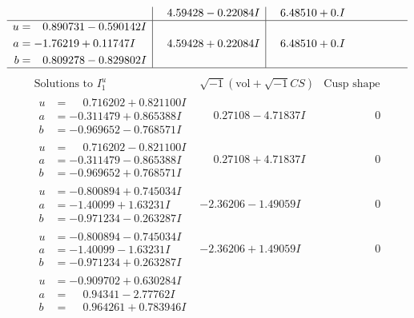 \documentclass[1p]{elsarticle_modified}
\theoremstyle{definition}
\newcommand{\I}{\sqrt{-1}}
\begin{document}
$$\begin{array}{c|c|c}
 & \phantom{-}4.59428 - 0.22084 I & \phantom{-}6.48510 + 0. I\phantom{ +0.000000I} \\ \hline\begin{aligned}
u &= \phantom{-}0.890731 - 0.590142 I \\
a &= -1.76219 + 0.11747 I \\
b &= \phantom{-}0.809278 - 0.829802 I\end{aligned}
 & \phantom{-}4.59428 + 0.22084 I & \phantom{-}6.48510 + 0. I\phantom{ +0.000000I}\\
 \hline 
 \end{array}$$\newpage$$\begin{array}{c|c|c}  
\text{Solutions to }I^u_{1}& \I (\text{vol} + \sqrt{-1}CS) & \text{Cusp shape}\\
 \hline 
\begin{aligned}
u &= \phantom{-}0.716202 + 0.821100 I \\
a &= -0.311479 + 0.865388 I \\
b &= -0.969652 - 0.768571 I\end{aligned}
 & \phantom{-}0.27108 - 4.71837 I & \phantom{-0.000000 } 0 \\ \hline\begin{aligned}
u &= \phantom{-}0.716202 - 0.821100 I \\
a &= -0.311479 - 0.865388 I \\
b &= -0.969652 + 0.768571 I\end{aligned}
 & \phantom{-}0.27108 + 4.71837 I & \phantom{-0.000000 } 0 \\ \hline\begin{aligned}
u &= -0.800894 + 0.745034 I \\
a &= -1.40099 + 1.63231 I \\
b &= -0.971234 - 0.263287 I\end{aligned}
 & -2.36206 - 1.49059 I & \phantom{-0.000000 } 0 \\ \hline\begin{aligned}
u &= -0.800894 - 0.745034 I \\
a &= -1.40099 - 1.63231 I \\
b &= -0.971234 + 0.263287 I\end{aligned}
 & -2.36206 + 1.49059 I & \phantom{-0.000000 } 0 \\ \hline\begin{aligned}
u &= -0.909702 + 0.630284 I \\
a &= \phantom{-}0.94341 - 2.77762 I \\
b &= \phantom{-}0.964261 + 0.783946 I\end{aligned}

\end{array}$$
\end{document}
